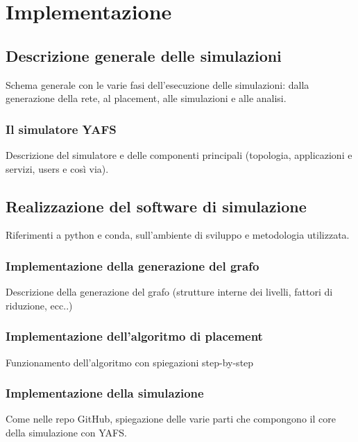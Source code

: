\chapter{Implementazione}
\label{chapter:implementazione}

\section{Descrizione generale delle simulazioni}

Schema generale con le varie fasi dell'esecuzione delle simulazioni: dalla generazione della rete, al placement, alle simulazioni e alle analisi.

\subsection{Il simulatore YAFS}

Descrizione del simulatore e delle componenti principali (topologia, applicazioni e servizi, users e così via).


\section{Realizzazione del software di simulazione}

Riferimenti a python e conda, sull'ambiente di sviluppo e metodologia utilizzata.

\subsection{Implementazione della generazione del grafo}

Descrizione della generazione del grafo (strutture interne dei livelli, fattori di riduzione, ecc..)

\subsection{Implementazione dell'algoritmo di placement}

Funzionamento dell'algoritmo con spiegazioni step-by-step

\subsection{Implementazione della simulazione}

Come nelle repo GitHub, spiegazione delle varie parti che compongono il core della simulazione con YAFS. 